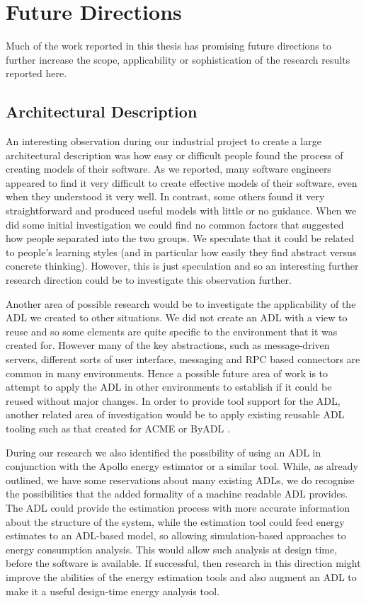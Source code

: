 \section{Future Directions}

Much of the work reported in this thesis has promising future directions to further increase the scope, applicability or sophistication of the research results reported here.

\subsection{Architectural Description}
\label{subsec:adl-further-work}

An interesting observation during our industrial project to create a large architectural description was how easy or difficult people found the process of creating models of their software.  As we reported, many software engineers appeared to find it very difficult to create effective models of their software, even when they understood it very well.  In contrast, some others found it very straightforward and produced useful models with little or no guidance.  When we did some initial investigation we could find no common factors that suggested how people separated into the two groups.  We speculate that it could be related to people's learning styles (and in particular how easily they find abstract versus concrete thinking).  However, this is just speculation and so an interesting further research direction could be to investigate this observation further.

Another area of possible research would be to investigate the applicability of the ADL we created to other situations.  We did not create an ADL with a view to reuse and so some elements are quite specific to the environment that it was created for.  However many of the key abstractions, such as message-driven servers, different sorts of user interface, messaging and RPC based connectors are common in many environments.  Hence a possible future area of work is to attempt to apply the ADL in other environments to establish if it could be reused without major changes.  In order to provide tool support for the ADL, another related area of investigation would be to apply existing reusable ADL tooling such as that created for ACME \cite{garlan1997-acme} or ByADL \cite{diruscio2010-byadl}.

During our research we also identified the possibility of using an ADL in conjunction with the Apollo energy estimator or a similar tool.  While, as already outlined, we have some reservations about many existing ADLs, we do recognise the possibilities that the added formality of a machine readable ADL provides.  The ADL could provide the estimation process with more accurate information about the structure of the system, while the estimation tool could feed energy estimates to an ADL-based model, so allowing simulation-based approaches to energy consumption analysis.  This would allow such analysis at design time, before the software is available.  If successful, then research in this direction might improve the abilities of the energy estimation tools and also augment an ADL to make it a useful design-time energy analysis tool.

